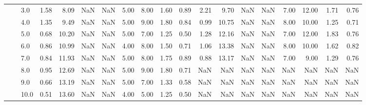 \begin{tabular}{lllrrrrrrrrrrrrrrrr}
       &     & 3.0  &      1.58 &       8.09 &               NaN &                NaN & 5.00 &   8.00 &             1.60 &                         0.89 &      2.21 &       9.70 &               NaN &                NaN & 7.00 &  12.00 &             1.71 &                         0.76 \\
       &     & 4.0  &      1.35 &       9.49 &               NaN &                NaN & 5.00 &   9.00 &             1.80 &                         0.84 &      0.99 &      10.75 &               NaN &                NaN & 8.00 &  10.00 &             1.25 &                         0.71 \\
       &     & 5.0  &      0.68 &      10.20 &               NaN &                NaN & 5.00 &   7.00 &             1.25 &                         0.50 &      1.28 &      12.16 &               NaN &                NaN & 7.00 &  12.00 &             1.83 &                         0.76 \\
       &     & 6.0  &      0.86 &      10.99 &               NaN &                NaN & 4.00 &   8.00 &             1.50 &                         0.71 &      1.06 &      13.38 &               NaN &                NaN & 8.00 &  10.00 &             1.62 &                         0.82 \\
       &     & 7.0  &      0.84 &      11.93 &               NaN &                NaN & 5.00 &   8.00 &             1.75 &                         0.89 &      0.88 &      13.17 &               NaN &                NaN & 7.00 &   9.00 &             1.29 &                         0.76 \\
       &     & 8.0  &      0.95 &      12.69 &               NaN &                NaN & 5.00 &   9.00 &             1.80 &                         0.71 &       NaN &        NaN &               NaN &                NaN &  NaN &    NaN &              NaN &                          NaN \\
       &     & 9.0  &      0.66 &      13.19 &               NaN &                NaN & 5.00 &   7.00 &             1.33 &                         0.58 &       NaN &        NaN &               NaN &                NaN &  NaN &    NaN &              NaN &                          NaN \\
       &     & 10.0 &      0.51 &      13.60 &               NaN &                NaN & 4.00 &   5.00 &             1.25 &                         0.50 &       NaN &        NaN &               NaN &                NaN &  NaN &    NaN &              NaN &                          NaN \\

\end{tabular}
